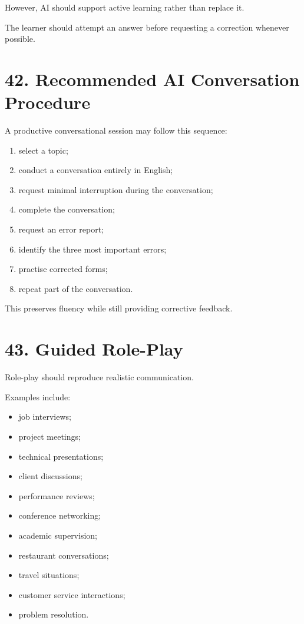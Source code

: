 However, AI should support active learning rather than replace it.

The learner should attempt an answer before requesting a correction whenever possible.

\section*{42. Recommended AI Conversation Procedure}

A productive conversational session may follow this sequence:

\begin{enumerate}
    \item select a topic;
    \item conduct a conversation entirely in English;
    \item request minimal interruption during the conversation;
    \item complete the conversation;
    \item request an error report;
    \item identify the three most important errors;
    \item practise corrected forms;
    \item repeat part of the conversation.
\end{enumerate}

This preserves fluency while still providing corrective feedback.

\section*{43. Guided Role-Play}

Role-play should reproduce realistic communication.

Examples include:

\begin{itemize}
    \item job interviews;
    \item project meetings;
    \item technical presentations;
    \item client discussions;
    \item performance reviews;
    \item conference networking;
    \item academic supervision;
    \item restaurant conversations;
    \item travel situations;
    \item customer service interactions;
    \item problem resolution.
\end{itemize}

